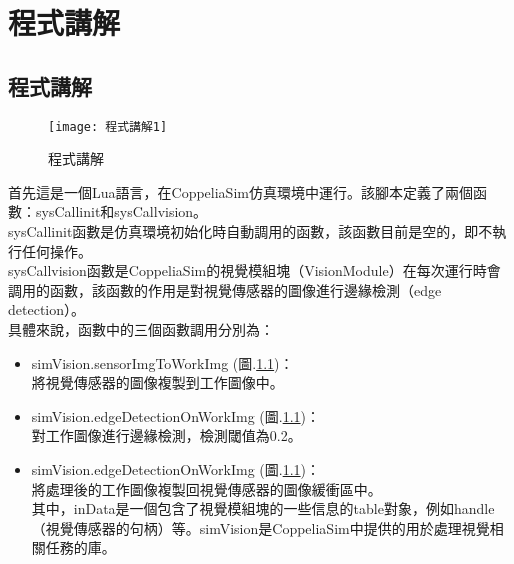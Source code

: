 \chapter{程式講解}
\section{程式講解}
\begin{figure}[hbt!]
\begin{center}
\texttt{[image: 程式講解1]}
\caption{\Large 程式講解}\label{程式講解}
\end{center}
\end{figure} 
首先這是一個Lua語言，在CoppeliaSim仿真環境中運行。該腳本定義了兩個函數：sysCallinit和sysCallvision。
\\
sysCallinit函數是仿真環境初始化時自動調用的函數，該函數目前是空的，即不執行任何操作。
\\
sysCallvision函數是CoppeliaSim的視覺模組塊（VisionModule）在每次運行時會調用的函數，該函數的作用是對視覺傳感器的圖像進行邊緣檢測（edge detection）。\\具體來說，函數中的三個函數調用分別為：
\begin{itemize}
\item simVision.sensorImgToWorkImg (圖.\ref{程式講解})：\\
將視覺傳感器的圖像複製到工作圖像中。\\
\item simVision.edgeDetectionOnWorkImg (圖.\ref{程式講解})：\\
對工作圖像進行邊緣檢測，檢測閾值為0.2。\\
\item simVision.edgeDetectionOnWorkImg (圖.\ref{程式講解})：\\
將處理後的工作圖像複製回視覺傳感器的圖像緩衝區中。\\
其中，inData是一個包含了視覺模組塊的一些信息的table對象，例如handle（視覺傳感器的句柄）等。simVision是CoppeliaSim中提供的用於處理視覺相關任務的庫。\\
\end{itemize}
